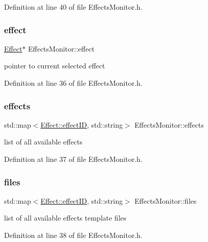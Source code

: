 Definition at line 40 of file Effects\+Monitor.\+h.

\mbox{\label{class_effects_monitor_a4ec98ceedd0d8bea006da1fc97f02124}} 
\subsubsection{\texorpdfstring{effect}{effect}}
{\footnotesize\ttfamily \hyperlink{class_effect}{Effect}$\ast$ Effects\+Monitor\+::effect}

pointer to current selected effect 

Definition at line 36 of file Effects\+Monitor.\+h.

\mbox{\label{class_effects_monitor_abf43aed9b7bcc0dee032f5e2e6a3e438}} 
\subsubsection{\texorpdfstring{effects}{effects}}
{\footnotesize\ttfamily std\+::map$<$\hyperlink{class_effect_a6422fe21e9e452943fbc3344884a6fed}{Effect\+::effect\+ID}, std\+::string$>$ Effects\+Monitor\+::effects}

list of all available effects 

Definition at line 37 of file Effects\+Monitor.\+h.

\mbox{\label{class_effects_monitor_a88dbd80c419f86e09919761011c2a152}} 
\subsubsection{\texorpdfstring{files}{files}}
{\footnotesize\ttfamily std\+::map$<$\hyperlink{class_effect_a6422fe21e9e452943fbc3344884a6fed}{Effect\+::effect\+ID}, std\+::string$>$ Effects\+Monitor\+::files}

list of all available effects template files 

Definition at line 38 of file Effects\+Monitor.\+h.

\mbox{\label{class_effects_monitor_aae2cb43d0ee0c182eca7309c561071ba}} 

